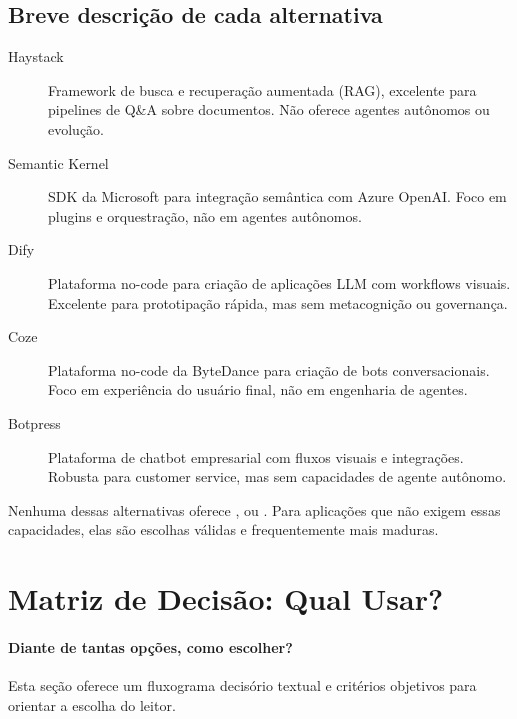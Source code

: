 \subsection{Breve descrição de cada alternativa}

\begin{description}
    \item[Haystack] Framework de busca e recuperação aumentada
          (RAG), excelente para pipelines de Q\&A sobre documentos.
          Não oferece agentes autônomos ou evolução.
    \item[Semantic Kernel] SDK da Microsoft para integração semântica
          com Azure OpenAI. Foco em plugins e orquestração, não em
          agentes autônomos.
    \item[Dify] Plataforma no-code para criação de aplicações LLM com
          workflows visuais. Excelente para prototipação rápida, mas sem
          metacognição ou governança.
    \item[Coze] Plataforma no-code da ByteDance para criação de bots
          conversacionais. Foco em experiência do usuário final, não em
          engenharia de agentes.
    \item[Botpress] Plataforma de chatbot empresarial com fluxos
          visuais e integrações. Robusta para customer service, mas sem
          capacidades de agente autônomo.
\end{description}

\noindent Nenhuma dessas alternativas oferece ,  ou . Para aplicações que não exigem essas capacidades, elas
são escolhas válidas e frequentemente mais maduras.

\section{Matriz de Decisão: Qual Usar?}
\label{sec:matriz-decisao}
\nivelintermediario

\paragraph{Diante de tantas opções, como escolher?} Esta seção oferece um
fluxograma decisório textual e critérios objetivos para orientar a escolha
do leitor.

